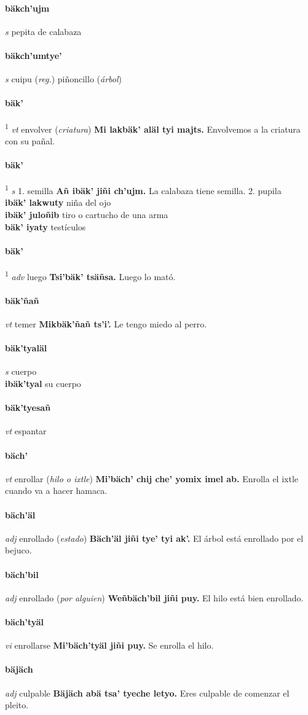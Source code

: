 \documentclass{scrbook}
\newcommand{\entry}[1]{\paragraph{#1}}
\newcommand{\onedefinition}[1]{#1.}
\newcommand{\defsuperscript}[1]{\textsuperscript{1}}
\newcommand{\partofspeech}[1]{\textit{#1}}
\newcommand{\spanishtranslation}[1]{#1}
\newcommand{\clarification}[1]{(\textit{#1})}
\newcommand{\cholexample}[1]{\textbf{#1}}
\newcommand{\exampletranslation}[1]{#1}
\newcommand{\secondaryentry}[1]{\\\textbf{#1}}
\newcommand{\secondtranslation}[1]{#1}
\begin{document}
\begin{multicols}{2}
\entry{bäkch'ujm}
\partofspeech{s}
\spanishtranslation{pepita de calabaza}

\entry{bäkch'umtye'}
\partofspeech{s}
\spanishtranslation{cuipu}
\clarification{reg.}
\spanishtranslation{piñoncillo}
\clarification{árbol}

\entry{bäk'}
\defsuperscript{3}
\partofspeech{vt}
\spanishtranslation{envolver}
\clarification{criatura}
\cholexample{Mi lakbäk' aläl tyi majts.}
\exampletranslation{Envolvemos a la criatura con su pañal.}

\entry{bäk'}
\defsuperscript{1}
\partofspeech{s}
\onedefinition{1}
\spanishtranslation{semilla}
\cholexample{Añ ibäk' jiñi ch'ujm.}
\exampletranslation{La calabaza tiene semilla.}
\onedefinition{2}
\spanishtranslation{pupila}
\secondaryentry{ibäk' lakwuty}
\secondtranslation{niña del ojo}
\secondaryentry{ibäk' juloñib}
\secondtranslation{tiro o cartucho de una arma}
\secondaryentry{bäk' iyaty}
\secondtranslation{testículos}

\entry{bäk'}
\defsuperscript{2}
\partofspeech{adv}
\spanishtranslation{luego}
\cholexample{Tsi'bäk' tsäñsa.}
\exampletranslation{Luego lo mató.}

\entry{bäk'ñañ}
\partofspeech{vt}
\spanishtranslation{temer}
\cholexample{Mikbäk'ñañ ts'i'.}
\exampletranslation{Le tengo miedo al perro.}

\entry{bäk'tyaläl}
\partofspeech{s}
\spanishtranslation{cuerpo}
\secondaryentry{ibäk'tyal}
\secondtranslation{su cuerpo}

\entry{bäk'tyesañ}
\partofspeech{vt}
\spanishtranslation{espantar}

\entry{bäch'}
\partofspeech{vt}
\spanishtranslation{enrollar}
\clarification{hilo o ixtle}
\cholexample{Mi'bäch' chij che' yomix imel ab.}
\exampletranslation{Enrolla el ixtle cuando va a hacer hamaca.}

\entry{bäch'äl}
\partofspeech{adj}
\spanishtranslation{enrollado}
\clarification{estado}
\cholexample{Bäch'äl jiñi tye' tyi ak'.}
\exampletranslation{El árbol está enrollado por el bejuco.}

\entry{bäch'bil}
\partofspeech{adj}
\spanishtranslation{enrollado}
\clarification{por alguien}
\cholexample{Weñbäch'bil jiñi puy.}
\exampletranslation{El hilo está bien enrollado.}

\entry{bäch'tyäl}
\partofspeech{vi}
\spanishtranslation{enrollarse}
\cholexample{Mi'bäch'tyäl jiñi puy.}
\exampletranslation{Se enrolla el hilo.}

\entry{bäjäch}
\partofspeech{adj}
\spanishtranslation{culpable}
\cholexample{Bäjäch abä tsa' tyeche letyo.}
\exampletranslation{Eres culpable de comenzar el pleito.}


\end{multicols}
\end{document}
